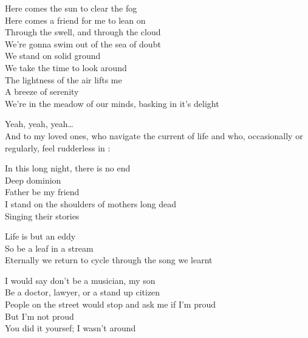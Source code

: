 Here comes the sun to clear the fog\\
Here comes a friend for me to lean on\\
Through the swell, and through the cloud\\
We're gonna swim out of the sea of doubt\\

We stand on solid ground\\
We take the time to look around\\
The lightness of the air lifts me\\
A breeze of serenity\\
We're in the meadow of our minds, basking in it's delight\\




Yeah, yeah, yeah…\\
And to my loved ones, who navigate the current of life and who, occasionally or regularly, feel rudderless in :\\


In this long night, there is no end\\
Deep dominion\\
Father be my friend\\
I stand on the shoulders of mothers long dead\\
Singing their stories\\


Life is but an eddy\\
So be a leaf in a stream\\
Eternally we return to cycle through the song we learnt\\


I would say don't be a musician, my son\\
Be a doctor, lawyer, or a stand up citizen\\
People on the street would stop and ask me if I'm proud\\
But I'm not proud\\
You did it yoursef; I wasn't around\\


